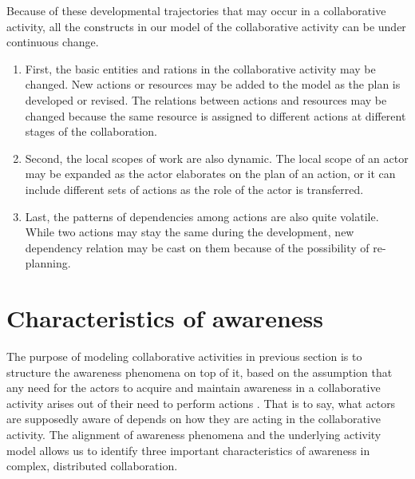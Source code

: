 Because of these developmental trajectories that may occur in a collaborative activity, all the constructs in our model of the collaborative activity can be under continuous change. 
\begin{enumerate}
	\item First, the basic entities and rations in the collaborative activity may be changed. New actions or resources may be added to the model as the plan is developed or revised. The relations between actions and resources may be changed because the same resource is assigned to different actions at different stages of the collaboration.
	\item Second, the local scopes of work are also dynamic.  The local scope of an actor may be expanded as the actor elaborates on the plan of an action, or it can include different sets of actions as the role of the actor is transferred.
	\item Last, the patterns of dependencies among actions are also quite volatile. While two actions may stay the same during the development, new dependency relation may be cast on them because of the possibility of re-planning.
\end{enumerate}

\section{Characteristics of awareness} %
\label{sec:awareness_requirements}
The purpose of modeling collaborative activities in previous section is to structure the awareness phenomena on top of it, based on the assumption that any need for the actors to acquire and maintain awareness in a collaborative activity arises out of their need to perform actions \cite{schmidt2002a}. That is to say, what actors are supposedly aware of depends on how they are acting in the collaborative activity. The alignment of awareness phenomena and the underlying activity model allows us to identify three important characteristics of awareness in complex, distributed collaboration.

